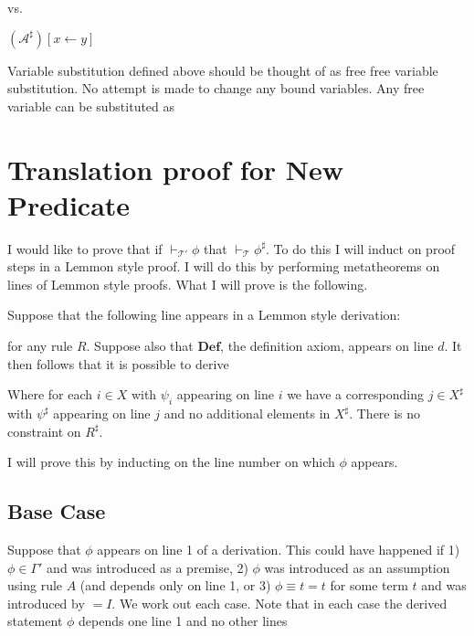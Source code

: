 \documentclass[12pt]{article}
\newcommand{\bv}[1]{\boldsymbol{#1}}
\newcommand{\mc}[1]{\mathcal{#1}}
\newcommand{\bc}[1]{\bv{\mc{#1}}}
\begin{document}
vs.

$(\mc{A}^{\sharp})[x\leftarrow y]$

Variable substitution defined above should be thought of as free free variable substitution. No attempt is made to change any bound variables. Any free variable can be substituted as


\section*{Translation proof for New Predicate}

I would like to prove that if $\vdash_{\bc{T}'}\phi$ that $\vdash_{\bc{T}}\phi^{\sharp}$. To do this I will induct on proof steps in a Lemmon style proof. I will do this by performing metatheorems on lines of Lemmon style proofs. What I will prove is the following.

Suppose that the following line appears in a Lemmon style derivation:

\begin{ND}[][][][][.6\linewidth]
\end{ND}

for any rule $R$.
Suppose also that $\textbf{Def}$, the definition axiom, appears on line $d$. It then follows that it is possible to derive

\begin{ND}[][][][][.6\linewidth]
\end{ND}

Where for each $i\in X$ with $\psi_i$ appearing on line $i$ we have a corresponding $j \in X^{\sharp}$ with $\psi^{\sharp}$ appearing on line $j$ and no additional elements in $X^{\sharp}$. There is no constraint on $R^{\sharp}$.

I will prove this by inducting on the line number on which $\phi$ appears.

\subsection*{Base Case}

Suppose that $\phi$ appears on line 1 of a derivation. This could have happened if 1) $\phi \in \Gamma'$ and was introduced as a premise, 2) $\phi$ was introduced as an assumption using rule $A$ (and depends only on line 1, or 3) $\phi \equiv t=t$ for some term $t$ and was introduced by $=I$. We work out each case. Note that in each case the derived statement $\phi$ depends one line 1 and no other lines
\end{document}
